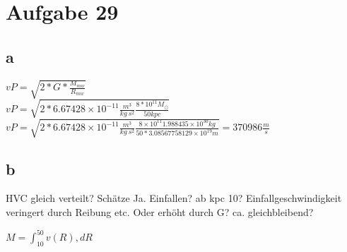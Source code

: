\section{Aufgabe 29}
\subsection{a}
$vP = \sqrt{2*G*\frac{M_{mw}}{R_{mw}}}$\\
$vP = \sqrt{2*6.67428 \times 10^{-11} \frac{m^3}{kg ~ s^2}  \frac{8*10^{11} M_{\odot}}{50 kpc}}$ \\
$vP = \sqrt{2*6.67428 \times 10^{-11} \frac{m^3}{kg ~ s^2}  \frac{8 \times 10^{11} 1.988435 \times 10^{30} kg}{50*3.08567758129 \times 10^{19} m}} = 370986 \frac{m}{s}$
\subsection{b}
HVC gleich verteilt? Schätze Ja.
Einfallen? ab kpc 10?
Einfallgeschwindigkeit veringert durch Reibung etc. Oder erhöht durch G? ca. gleichbleibend?

$M= \int_{10}^{50} v(R)  , dR$
